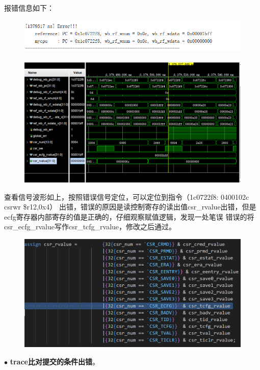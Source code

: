 \documentclass[11pt]{article}
\begin{document}
    报错信息如下：
    \begin{figure}[H]
        \centering
        \includegraphics[width=15cm]{fig/9.png}
      \end{figure}
      \begin{figure}[H]
        \centering
        \includegraphics[width=15cm]{fig/10.png}
      \end{figure}
    查看信号波形如上，按照错误信号定位，可以定位到指令（1c0722f8:	0400102c 	csrwr	\$r12,0x4）
    出错，错误的原因是读控制寄存的读出值csr_rvalue出错，但是ecfg寄存器内部寄存的值是正确的，仔细观察赋值逻辑，发现一处笔误
    错误的将csr_ecfg_rvalue写作csr_tcfg_rvalue，修改之后通过。
    \begin{figure}[H]
        \centering
        \includegraphics[width=15cm]{fig/11.png}
      \end{figure}

      \noindent
      $\bullet$
      \textbf{trace比对提交的条件出错}。
  
\end{document}
